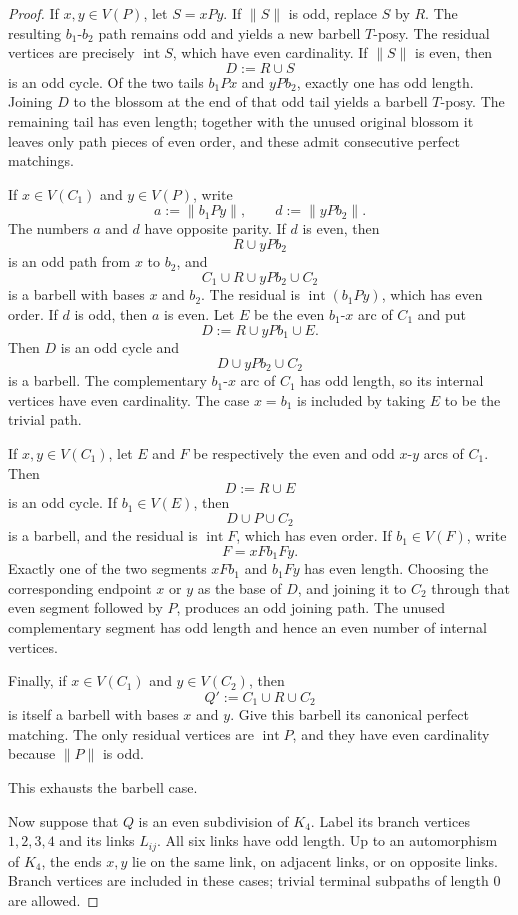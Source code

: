 \documentclass[10pt,a4paper]{amsart}
\begin{document}
\begin{proof}
If \(x,y\in V(P)\), let \(S=xPy\). If \(\|S\|\) is odd, replace \(S\)
by \(R\). The resulting \(b_1\)-\(b_2\) path remains odd and yields a
new barbell \(T\)-posy. The residual vertices are precisely
\(\operatorname{int}S\), which have even cardinality. If \(\|S\|\) is
even, then
\[
D:=R\cup S
\]
is an odd cycle. Of the two tails \(b_1Px\) and \(yPb_2\), exactly one
has odd length. Joining \(D\) to the blossom at the end of that odd
tail yields a barbell \(T\)-posy. The remaining tail has even length;
together with the unused original blossom it leaves only path pieces
of even order, and these admit consecutive perfect matchings.

If \(x\in V(C_1)\) and \(y\in V(P)\), write
\[
a:=\|b_1Py\|,
\qquad
d:=\|yPb_2\|.
\]
The numbers \(a\) and \(d\) have opposite parity. If \(d\) is even,
then
\[
R\cup yPb_2
\]
is an odd path from \(x\) to \(b_2\), and
\[
C_1\cup R\cup yPb_2\cup C_2
\]
is a barbell with bases \(x\) and \(b_2\). The residual is
\(\operatorname{int}(b_1Py)\), which has even order. If \(d\) is odd,
then \(a\) is even. Let \(E\) be the even \(b_1\)-\(x\) arc of \(C_1\)
and put
\[
D:=R\cup yPb_1\cup E.
\]
Then \(D\) is an odd cycle and
\[
D\cup yPb_2\cup C_2
\]
is a barbell. The complementary \(b_1\)-\(x\) arc of \(C_1\) has odd
length, so its internal vertices have even cardinality. The case
\(x=b_1\) is included by taking \(E\) to be the trivial path.

If \(x,y\in V(C_1)\), let \(E\) and \(F\) be respectively the even and
odd \(x\)-\(y\) arcs of \(C_1\). Then
\[
D:=R\cup E
\]
is an odd cycle. If \(b_1\in V(E)\), then
\[
D\cup P\cup C_2
\]
is a barbell, and the residual is \(\operatorname{int}F\), which has
even order. If \(b_1\in V(F)\), write
\[
F=xFb_1Fy.
\]
Exactly one of the two segments \(xFb_1\) and \(b_1Fy\) has even
length. Choosing the corresponding endpoint \(x\) or \(y\) as the base
of \(D\), and joining it to \(C_2\) through that even segment followed
by \(P\), produces an odd joining path. The unused complementary
segment has odd length and hence an even number of internal vertices.

Finally, if \(x\in V(C_1)\) and \(y\in V(C_2)\), then
\[
Q':=C_1\cup R\cup C_2
\]
is itself a barbell with bases \(x\) and \(y\). Give this barbell its
canonical perfect matching. The only residual vertices are
\(\operatorname{int}P\), and they have even cardinality because
\(\|P\|\) is odd.

This exhausts the barbell case.

Now suppose that \(Q\) is an even subdivision of \(K_4\). Label its
branch vertices \(1,2,3,4\) and its links \(L_{ij}\). All six links
have odd length. Up to an automorphism of \(K_4\), the ends \(x,y\)
lie on the same link, on adjacent links, or on opposite links. Branch
vertices are included in these cases; trivial terminal subpaths of
length \(0\) are allowed.


\end{proof}
\end{document}
